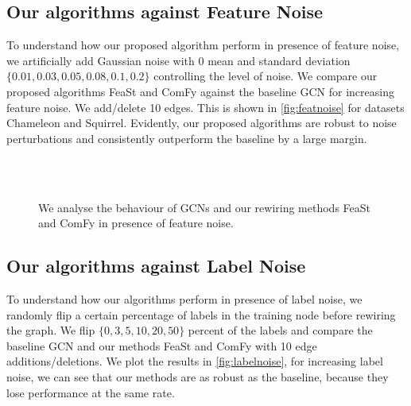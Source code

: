 \subsection{Our algorithms against Feature Noise}\label{app:featnoise}
To understand how our proposed algorithm perform in presence of feature noise, we artificially add Gaussian noise with $0$ mean and standard deviation  $\{0.01,0.03, 0.05, 0.08, 0.1,0.2\}$ controlling the level of noise. We compare our proposed algorithms FeaSt and ComFy against the baseline GCN for increasing feature noise. We add/delete 10 edges. This is shown in \autoref{fig:featnoise} for datasets Chameleon and Squirrel. Evidently, our proposed algorithms are robust to noise perturbations and consistently outperform the baseline by a large margin.


\begin{figure}[ht]
   \centering
   \hspace*{0pt}\hfill
   \hfill
   \hfill\hspace*{0pt}
   \\
   \hspace*{0pt}\hfill
   \hfill
   \hfill\hspace*{0pt}\\ 
   \caption{We analyse the behaviour of GCNs and our rewiring methods FeaSt and ComFy in presence of feature noise.}
   \label{fig:featnoise}
\end{figure}

\subsection{Our algorithms against Label Noise} \label{app:labelnoise}
To understand how our algorithms perform in presence of label noise, we randomly flip a certain percentage of labels in the training node before rewiring the graph. We flip $\{0,3,5,10,20,50\}$ percent of the labels and compare the baseline GCN and our methods FeaSt and ComFy with 10 edge additions/deletions. We plot the results in \autoref{fig:labelnoise}, for increasing label noise, we can see that our methods are as robust as the baseline, because they lose performance at the same rate.


